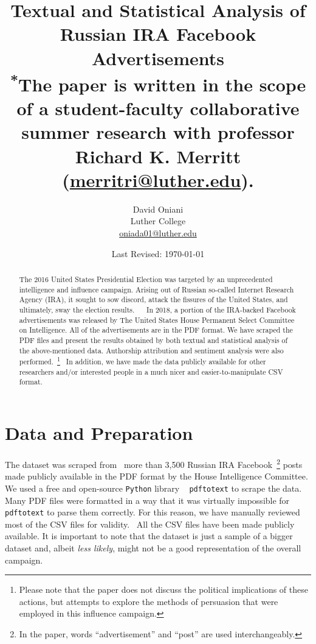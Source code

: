 \documentclass{article}
\author{David Oniani\\
        Luther College\\
        \href{mailto:oniada01@luther.edu}{oniada01@luther.edu}}
\title{\textbf{Textual and Statistical Analysis of Russian IRA Facebook Advertisements}\\
       \medskip
       \small \textsuperscript{*}The paper is written in the scope of a
       student-faculty collaborative\\ summer research with professor Richard
       K. Merritt (\href{mailto:merritri@luther.edu}{merritri@luther.edu}).}
\date{Last Revised: \today}
\begin{document}
\maketitle


\begin{abstract}

\noindent The 2016 United States Presidential Election was targeted by an
unprecedented intelligence and influence campaign. Arising out of Russian
so-called Internet Research Agency (IRA), it sought to sow discord, attack
the fissures of the United States, and ultimately, sway the election results.
~\cite{ira2016}~\cite{ira2016data} In 2018, a portion of the IRA-backed
Facebook advertisements was released by The United States House Permanent
Select Committee on Intelligence. All of the advertisements are in the PDF
format. We have scraped the PDF files and present the results obtained by both
textual and statistical analysis of the above-mentioned data. Authorship
attribution and sentiment analysis were also performed.~\footnote{Please note
that the paper does not discuss the political implications of these actions,
but attempts to explore the methods of persuasion that were employed in this
influence campaign.}~\cite{ira2016csvdata} In addition, we have made the data
publicly available for other researchers and/or interested people in a much
nicer and easier-to-manipulate CSV format.

\end{abstract}


\section{Data and Preparation}

The dataset was scraped from~\cite{ira2016data} more than 3,500 Russian IRA
Facebook~\footnote{In the paper, words ``advertisement'' and ``post'' are used
interchangeably.} posts made publicly available in the PDF format by the House
Intelligence Committee. We used a free and open-source \texttt{Python} library
~\cite{pdftotext} \texttt{pdftotext} to scrape the data. Many PDF files were
formatted in a way that it was virtually impossible for \texttt{pdftotext} to
parse them correctly. For this reason, we have manually reviewed most of the
CSV files for validity.~\cite{ira2016csvdata} All the CSV files have been made
publicly available. It is important to note that the dataset is just a sample
of a bigger dataset and, albeit \textit{less likely}, might not be a good
representation of the overall campaign.
\end{document}
